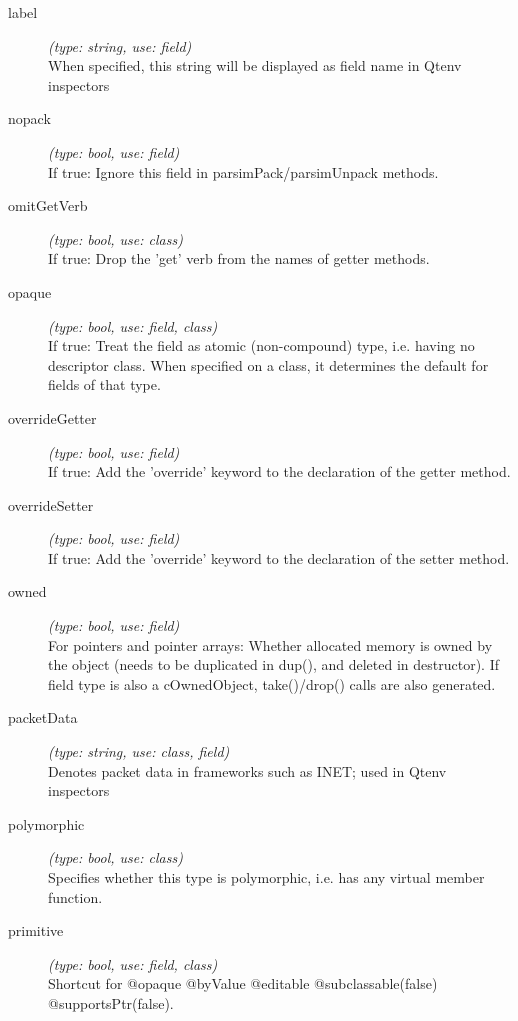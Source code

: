\begin{description}
\item[label] \textit{(type: string, use: field)} \\
  When specified, this string will be displayed as field name in Qtenv
  inspectors

\item[nopack] \textit{(type: bool, use: field)} \\
  If true: Ignore this field in parsimPack/parsimUnpack methods.

\item[omitGetVerb] \textit{(type: bool, use: class)} \\
  If true: Drop the 'get' verb from the names of getter methods.

\item[opaque] \textit{(type: bool, use: field, class)} \\
  If true: Treat the field as atomic (non-compound) type, i.e. having no
  descriptor class. When specified on a class, it determines the default for
  fields of that type.

\item[overrideGetter] \textit{(type: bool, use: field)} \\
  If true: Add the 'override' keyword to the declaration of the getter method.

\item[overrideSetter] \textit{(type: bool, use: field)} \\
  If true: Add the 'override' keyword to the declaration of the setter method.

\item[owned] \textit{(type: bool, use: field)} \\
  For pointers and pointer arrays: Whether allocated memory is owned by the
  object (needs to be duplicated in dup(), and deleted in destructor). If
  field type is also a cOwnedObject, take()/drop() calls are also generated.

\item[packetData] \textit{(type: string, use: class, field)} \\
  Denotes packet data in frameworks such as INET; used in Qtenv inspectors

\item[polymorphic] \textit{(type: bool, use: class)} \\
  Specifies whether this type is polymorphic, i.e. has any virtual member
  function.

\item[primitive] \textit{(type: bool, use: field, class)} \\
  Shortcut for @opaque @byValue @editable @subclassable(false)
  @supportsPtr(false).


\end{description}
